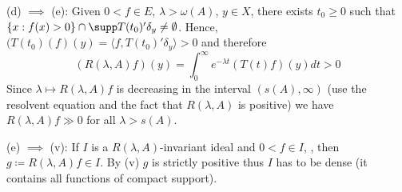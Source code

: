 (d) $\implies$ (e): Given $0 < f \in E$, $\lambda > \omega(A)$, $y \in X$, there exists $t_{0} \geq 0$ such that $\{x : f(x) > 0\} \cap \supp T(t_{0})'\delta_{y} \neq \emptyset$.
Hence, $(T(t_{0})(f)(y) = \langle f,T(t_{0})'\delta_{y} \rangle > 0$ and therefore
\[
(R(\lambda,A)f)(y) = \int_{0}^{\infty} e^{-\lambda t}(T(t)f)(y) dt > 0
\]
Since $\lambda \mapsto R(\lambda,A)f$ is decreasing in the interval $(s(A),\infty)$ (use the resolvent equation and the fact that $R(\lambda,A)$ is positive) we have $R(\lambda,A)f \gg 0$ for all $\lambda > s(A)$.

(e) $\implies$ (v): If $I$ is a $R(\lambda,A)$-invariant ideal and 0$ < f \in I$, , then $g \coloneqq R(\lambda,A)f \in I$. By (v) $g$ is strictly positive thus $I$ has to be dense (it contains all functions of compact support). 

